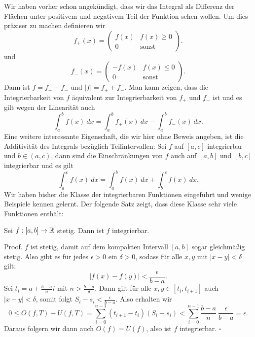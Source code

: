 Wir haben vorher schon angekündigt, dass wir das Integral als Differenz der Flächen unter positivem und negativem Teil der Funktion sehen wollen. Um dies präziser zu machen definieren wir
\begin{equation*}
 f_+(x) = \begin{pmatrix} f(x) & f(x) \geq 0 \\ 0 & \text{sonst} \end{pmatrix}.
\end{equation*}
und
\begin{equation*}
  f_-(x) = \begin{pmatrix}-f(x) & f(x) \leq 0 \\ 0 & \text{sonst} \end{pmatrix}.
\end{equation*}
Dann ist \(f = f_+ - f_-\) und \(|f|=f_+ + f_-\). Man kann zeigen, dass die Integrierbarkeit von \(f\) äquivalent zur Integrierbarkeit von \(f_+\) und \(f_-\) ist und es gilt wegen der Linearität auch
\begin{equation*}
 \int_a^b f(x)~dx = \int_a^b f_+(x)~dx - \int_a^b f_-(x)~dx.
\end{equation*}
Eine weitere interessante Eigenschaft, die wir hier ohne Beweis angeben, ist die Additivität des Integrals bezüglich Teilintervallen: Sei \(f\) auf \([a,c]\) integrierbar und \(b \in (a,c)\), dann sind die Einschränkungen von \(f\) auch auf \([a,b]\) und \([b,c]\) integrierbar und es gilt
\begin{equation*}
 \int_a^c f(x)~dx =  \int_a^b f(x)~dx + \int_b^c f(x)~dx .
\end{equation*}
Wir haben bisher die Klasse der integrierbaren Funktionen eingeführt und wenige Beispiele kennen gelernt. Der folgende Satz zeigt, dass diese Klasse sehr viele Funktionen enthält:
\label{integration/riemann:theorem-3}
\begin{theorem}{}{}



Sei \(f:[a,b] \rightarrow \mathbb{R}\) stetig. Dann ist \(f\) integrierbar.
\end{theorem}

\begin{emphBox}{}{}
Proof.  \(f\) ist stetig, damit auf dem kompakten Intervall \([a,b]\) sogar gleichmäßig stetig. Also gibt es für jedes \(\epsilon >0 \) ein \(\delta > 0\), sodass für alle \(x,y\) mit \(|x-y| < \delta\) gilt:
\begin{equation*}
 \vert f(x) - f(y) \vert < \frac{\epsilon}{b-a}.
\end{equation*}
Sei \(t_i = a + \frac{b-a}{n} i\) mit \(n > \frac{b-a}\delta\). Dann gilt für alle \(x,y \in [t_i,t_{i+1}]\) auch \(|x-y| < \delta\), somit folgt
\(S_i - s_i < \frac{\epsilon}{b-a}\). Also erhalten wir
\begin{equation*}
 0 \leq O(f,T) - U(f,T) = \sum_{i=0}^{n-1} (t_{i+1}-t_i)(S_i-s_i) < \sum_{i=0}^{n-1} \frac{b-a}{n} ~ \frac{\epsilon}{b-a} = \epsilon.
\end{equation*}
Daraus folgern wir dann auch \(O(f) = U(f)\), also ist \(f\) integrierbar. \(\square\)
\end{emphBox}


